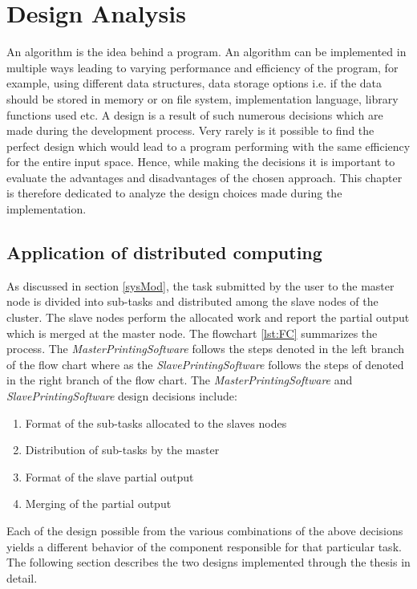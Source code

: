 \chapter{Design Analysis}
An algorithm is the idea behind a program. An algorithm can be implemented in multiple ways leading to varying performance and efficiency of the program, for example, using different data structures, data storage options i.e. if the data should be stored in memory or on file system, implementation language, library functions used etc. A design is a result of such numerous decisions which are made during the development process.  Very rarely is it possible to find the perfect design which would lead to a program performing with the same efficiency for the entire input space. Hence, while making the decisions it is important to evaluate the advantages and disadvantages of the chosen approach. This chapter is therefore dedicated to analyze the design choices made during the implementation. 

\section{Application of distributed computing}

As discussed in section \ref{sysMod}, the task submitted by the user to the master node is divided into sub-tasks and distributed among the slave nodes of the cluster. The slave nodes perform the allocated work and report the partial output which is merged at the master node. The flowchart \ref{lst:FC} summarizes the process. The \textit{MasterPrintingSoftware} follows the steps denoted in the left branch of the flow chart where as the \textit{SlavePrintingSoftware} follows the steps of denoted in the right branch of the flow chart. The \textit{MasterPrintingSoftware} and \textit{SlavePrintingSoftware} design decisions include:
\begin{enumerate}
\item Format of the sub-tasks allocated to the slaves nodes
\item Distribution of sub-tasks by the master
\item Format of the slave partial output 
\item Merging of the partial output 
\end{enumerate}

Each of the design possible from the various combinations of the above decisions yields a different behavior of the component responsible for that particular task. The following section describes the two designs implemented through the thesis in detail.  

